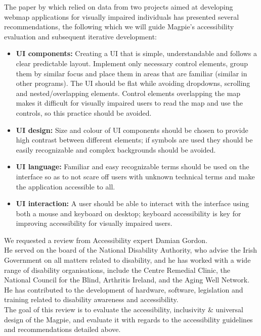 \noindent The paper by \cite{accessibilitywebmapsrecommendations2017} which relied on data from two projects aimed at developing web\-map applications for visually impaired individuals has presented several recommendations, the following which we will guide Magpie's accessibility evaluation and subsequent iterative development:
\begin{itemize}
    \item\textbf{UI components:} Creating a UI that is simple, understandable and follows a clear predictable layout. Implement only necessary control elements, group them by similar focus and place them in areas that are familiar (similar in other programs). The UI should be flat while avoiding dropdowns, scrolling and nested/overlapping elements. Control elements overlapping the map makes it difficult for visually impaired users to read the map and use the controls, so this practice should be avoided.
    \item\textbf{UI design:} Size and colour of UI components should be chosen to provide high contrast between different elements; if symbols are used they should be easily recognizable and complex backgrounds should be avoided.
    \item\textbf{UI language:} Familiar and easy recognizable terms should be used on the interface so as to not scare off users with unknown technical terms and make the application accessible to all.
    \item\textbf{UI interaction:} A user should be able to interact with the interface using both a mouse and keyboard on desktop; keyboard accessibility is key for improving accessibility for visually impaired users.
\end{itemize}

\newpage
\noindent We requested a review from Accessibility expert Damian Gordon.\\
He served on the board of the National Disability Authority, who advise the Irish Government on all matters related to disability, and he has worked with a wide range of disability organisations, include the Centre Remedial Clinic, the National Council for the Blind, Arthritis Ireland, and the Aging Well Network. He has contributed to the development of hardware, software, legislation and training related to disability awareness and accessibility. \\

\noindent The goal of this review is to evaluate the accessibility, inclusivity \& universal design of the Magpie, and evaluate it with regards to the accessibility guidelines and recommendations detailed above.\\

